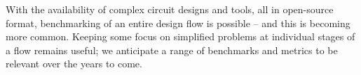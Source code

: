 \documentclass[sigconf]{acmart}
\begin{document}
With the availability of complex circuit designs and tools, all in
open-source format, benchmarking of an entire design flow is possible --
and this is becoming more common.  Keeping some focus on simplified
problems at individual stages of a flow remains useful; we 
anticipate a range of benchmarks and metrics to be relevant over
the years to come.




\balance


\end{document}
